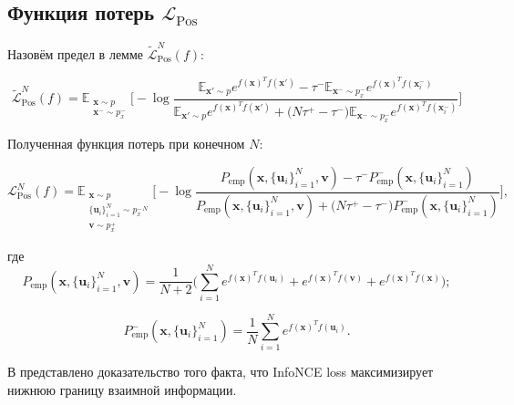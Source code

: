 \documentclass[a4paper, 14pt]{article}
\begin{document}
\subsection{Функция потерь $\mathcal{L}_{\text{Pos}}$}

Назовём предел в лемме $\tilde{\mathcal{L}}_{\text{Pos}}^N (f)$:

\begin{equation} \label{eq:10}
\tilde{\mathcal{L}}_{\text{Pos}}^N (f) = \mathbb{E}_{\substack{\textbf{x} \sim p \\ \textbf{x}^- \sim p_x^-}} \bigg[ - \log \frac{\mathbb{E}_{\textbf{x}' \sim p} e^{f(\textbf{x})^T f(\textbf{x}')} - \tau^- \mathbb{E}_{\textbf{x}^- \sim p_x^-} e^{f(\textbf{x})^T f(\textbf{x}_i^-)}}{\mathbb{E}_{\textbf{x}' \sim p} e^{f(\textbf{x})^T f(\textbf{x}')} + \big(N \tau^+ - \tau^-\big) \mathbb{E}_{\textbf{x}^- \sim p_x^-} e^{f(\textbf{x})^T f(\textbf{x}_i^-)}}\bigg]
\end{equation}

Полученная функция потерь при конечном $N$:

\begin{equation}\label{eq:11}
\mathcal{L}_{\text{Pos}}^N (f) = \mathbb{E}_{\substack{\textbf{x} \sim p \\ \{\textbf{u}_i\}_{i=1}^N \sim {p_x^-}^N \\ \textbf{v} \sim p_x^+}} \bigg[-\log \frac{P_{\text{emp}} (\textbf{x}, \{\textbf{u}_i\}_{i=1}^N, \textbf{v}) - \tau^- P_{\text{emp}}^- (\textbf{x}, \{\textbf{u}_i\}_{i=1}^N)} {P_{\text{emp}} (\textbf{x}, \{\textbf{u}_i\}_{i=1}^N, \textbf{v})+ \big(N \tau^+ - \tau^-\big) P_{\text{emp}}^- (\textbf{x}, \{\textbf{u}_i\}_{i=1}^N) }\bigg],
\end{equation}

\noindent где
\begin{equation} \label{eq:12}
P_{\text{emp}} (\textbf{x}, \{\textbf{u}_i\}_{i=1}^N, \textbf{v}) = \frac{1}{N+2} \bigg(\sum \limits_{i=1}^N e^{f(\textbf{x})^T f(\textbf{u}_i)} + e^{f(\textbf{x})^T f(\textbf{v})} + e^{f(\textbf{x})^T f(\textbf{x})}\bigg);
\end{equation}

\begin{equation} \label{eq:13}
P_{\text{emp}}^- (\textbf{x}, \{\textbf{u}_i\}_{i=1}^N) = \frac{1}{N} \sum \limits_{i=1}^N e^{f(\textbf{x})^T f(\textbf{u}_i)}.
\end{equation}

В \citep{Oord2018RepresentationLW} представлено доказательство того факта, что InfoNCE loss максимизирует нижнюю границу взаимной информации.
\end{document}

